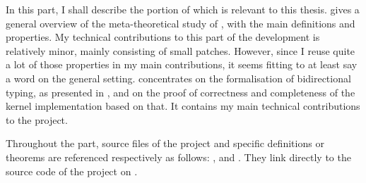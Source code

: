 In this part, I shall describe the portion of  which is relevant to this thesis.
 gives a general overview of the meta-theoretical study of ,
with the main definitions and properties.
My technical contributions to this part of the development is relatively minor,
mainly consisting of small patches. However, since I reuse quite a lot of those properties
in my main contributions, it seems fitting to at least say a word on the general setting.
 concentrates on the formalisation of bidirectional typing, as
presented in , and on the proof of correctness and completeness of
the kernel implementation based on that. It contains my main technical
contributions to the  project.

Throughout the part, source files of the  project
and specific definitions or theorems are referenced respectively as follows:
, and . They link directly to the source
code of the project on .

\begin{theorem}
\label{thm:pcuic-confluence}

\end{theorem}